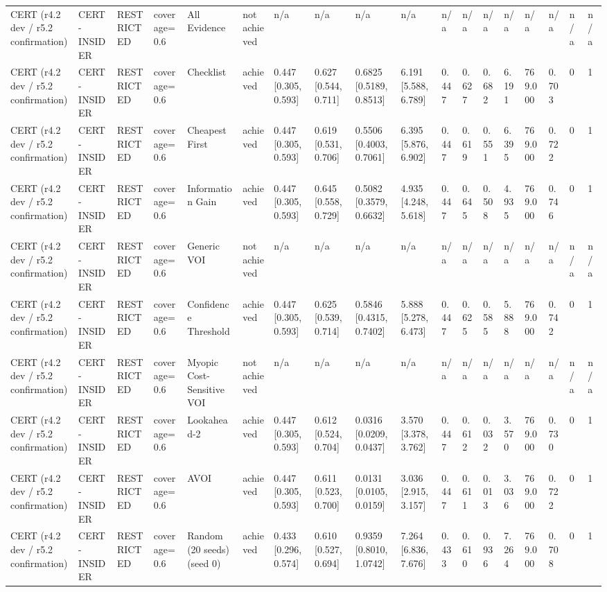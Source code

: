 \begin{table}[!ht]
{\begin{tabular}{llllllllllllllllll}
CERT (r4.2 dev / r5.2 confirmation) & CERT-INSIDER & RESTRICTED & coverage=0.6 & All Evidence & not achieved & n/a & n/a & n/a & n/a & n/a & n/a & n/a & n/a & n/a & n/a & n/a & n/a \\
CERT (r4.2 dev / r5.2 confirmation) & CERT-INSIDER & RESTRICTED & coverage=0.6 & Checklist & achieved & 0.447 [0.305, 0.593] & 0.627 [0.544, 0.711] & 0.6825 [0.5189, 0.8513] & 6.191 [5.588, 6.789] & 0.447 & 0.627 & 0.682 & 6.191 & 769.000 & 0.703 & 0 & 1 \\
CERT (r4.2 dev / r5.2 confirmation) & CERT-INSIDER & RESTRICTED & coverage=0.6 & Cheapest First & achieved & 0.447 [0.305, 0.593] & 0.619 [0.531, 0.706] & 0.5506 [0.4003, 0.7061] & 6.395 [5.876, 6.902] & 0.447 & 0.619 & 0.551 & 6.395 & 769.000 & 0.722 & 0 & 1 \\
CERT (r4.2 dev / r5.2 confirmation) & CERT-INSIDER & RESTRICTED & coverage=0.6 & Information Gain & achieved & 0.447 [0.305, 0.593] & 0.645 [0.558, 0.729] & 0.5082 [0.3579, 0.6632] & 4.935 [4.248, 5.618] & 0.447 & 0.645 & 0.508 & 4.935 & 769.000 & 0.746 & 0 & 1 \\
CERT (r4.2 dev / r5.2 confirmation) & CERT-INSIDER & RESTRICTED & coverage=0.6 & Generic VOI & not achieved & n/a & n/a & n/a & n/a & n/a & n/a & n/a & n/a & n/a & n/a & n/a & n/a \\
CERT (r4.2 dev / r5.2 confirmation) & CERT-INSIDER & RESTRICTED & coverage=0.6 & Confidence Threshold & achieved & 0.447 [0.305, 0.593] & 0.625 [0.539, 0.714] & 0.5846 [0.4315, 0.7402] & 5.888 [5.278, 6.473] & 0.447 & 0.625 & 0.585 & 5.888 & 769.000 & 0.742 & 0 & 1 \\
CERT (r4.2 dev / r5.2 confirmation) & CERT-INSIDER & RESTRICTED & coverage=0.6 & Myopic Cost-Sensitive VOI & not achieved & n/a & n/a & n/a & n/a & n/a & n/a & n/a & n/a & n/a & n/a & n/a & n/a \\
CERT (r4.2 dev / r5.2 confirmation) & CERT-INSIDER & RESTRICTED & coverage=0.6 & Lookahead-2 & achieved & 0.447 [0.305, 0.593] & 0.612 [0.524, 0.704] & 0.0316 [0.0209, 0.0437] & 3.570 [3.378, 3.762] & 0.447 & 0.612 & 0.032 & 3.570 & 769.000 & 0.730 & 0 & 1 \\
CERT (r4.2 dev / r5.2 confirmation) & CERT-INSIDER & RESTRICTED & coverage=0.6 & AVOI & achieved & 0.447 [0.305, 0.593] & 0.611 [0.523, 0.700] & 0.0131 [0.0105, 0.0159] & 3.036 [2.915, 3.157] & 0.447 & 0.611 & 0.013 & 3.036 & 769.000 & 0.722 & 0 & 1 \\
CERT (r4.2 dev / r5.2 confirmation) & CERT-INSIDER & RESTRICTED & coverage=0.6 & Random (20 seeds) (seed 0) & achieved & 0.433 [0.296, 0.574] & 0.610 [0.527, 0.694] & 0.9359 [0.8010, 1.0742] & 7.264 [6.836, 7.676] & 0.433 & 0.610 & 0.936 & 7.264 & 769.000 & 0.708 & 0 & 1 \\

\end{tabular}}
\end{table}
